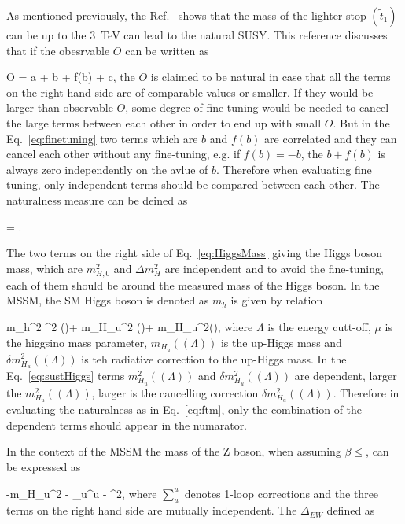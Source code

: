 As mentioned previously, the Ref.~\cite{Baer:2016bwh} shows that the mass of the lighter stop $(\tilde{t}_{1})$ can be up to the 3~TeV can lead to the natural SUSY. This reference discusses that if the obesrvable $O$ can be written as

{
O = a + b + f(b) + c,
}
the $O$ is claimed to be natural in case that all the terms on the right hand side are of comparable values or smaller. If they would be larger than observable $O$, some degree of fine tuning would be needed to cancel the large terms between each other in order to end up with small $O$. But in the Eq.~\ref{eq:finetuning} two terms which are $b$ and $f(b)$ are correlated and they can cancel each other without any fine-tuning, e.g. if $f(b) = -b$, the $b+f(b)$ is always zero independently on the avlue of $b$. Therefore when evaluating fine tuning, only independent terms should be compared between each other. The naturalness measure can be deined as 

{
\Delta = .
}

The two terms on the right side of  Eq.~\ref{eq:HiggsMass} giving the Higgs boson mass, which are $m_{H,0}^{2}$ and $\Delta m_{H}^{2}$ are independent and to avoid the fine-tuning, each of them should be around the measured mass of the Higgs boson. In the MSSM, the SM Higgs boson is denoted as $m_{h}$ is given by relation

{
m_{h}^{2}  \mu^{2} (\Lambda)+ m_{H_{u}}^{2} (\Lambda)+ \delta m_{H_{u}}^{2}(\Lambda),
}
where $\Lambda$ is the energy cutt-off, $\mu$ is the higgsino mass parameter, $m_{H_{u}}((\Lambda))$ is the up-Higgs mass and $\delta m_{H_{u}}^{2}((\Lambda))$ is teh radiative correction to the up-Higgs mass. In the Eq.~\ref{eq:sustHiggs} terms $m_{H_{u}}^{2} ((\Lambda))$ and  $\delta m_{H_{u}}^{2} ((\Lambda))$ are dependent, larger the $m_{H_{u}}^{2} ((\Lambda))$, larger is the cancelling correction  $\delta m_{H_{u}}^{2} ((\Lambda))$. Therefore in evaluating the naturalness as in Eq.~\ref{eq:ftm}, only the combination of the dependent terms should appear in the numarator.

In the context of the MSSM the mass of the Z boson, when assuming $\beta \leq$, can be expressed as 

{
 \simeq -m_{H_{u}}^{2} - \sum_{u}^{u} - \mu^{2},
}
where $\sum_{u}^{u}$ denotes 1-loop corrections and the three terms on the right hand side are mutually independent. The $\Delta_{EW}$ defined as


